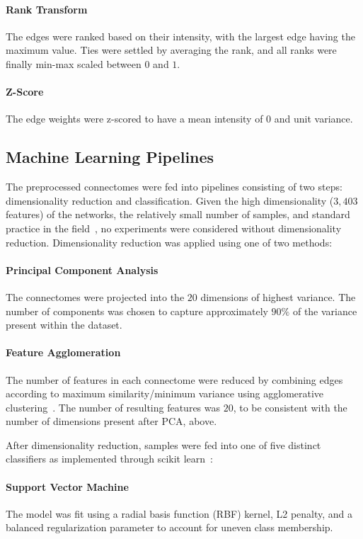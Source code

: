 \documentclass[num-refs]{nbdt-article}
\begin{document}
\paragraph{Rank Transform} The edges were ranked based on their intensity, with the largest edge having the maximum value. Ties were settled by averaging the rank, and all ranks were finally min-max scaled between $0$ and $1$.

\paragraph{Z-Score} The edge weights were z-scored to have a mean intensity of $0$ and unit variance.

\subsection{Machine Learning Pipelines}

The preprocessed connectomes were fed into pipelines consisting of two steps: dimensionality reduction and classification. Given the high dimensionality ($3,403$ features) of the networks, the relatively small number of samples, and standard practice in the field~\cite{Payabvash2019-tm,Park2015-uj,weis2020sex}, no experiments were considered without dimensionality reduction. Dimensionality reduction was applied using one of two methods:

\paragraph{Principal Component Analysis} The connectomes were projected into the $20$ dimensions of highest variance. The number of components was chosen to capture approximately $90\%$ of the variance present within the dataset.

\paragraph{Feature Agglomeration} The number of features in each connectome were reduced by combining edges according to maximum similarity/minimum variance using agglomerative clustering~\cite{Ward1963-uh}. The number of resulting features was $20$, to be consistent with the number of dimensions present after PCA, above.

After dimensionality reduction, samples were fed into one of five distinct classifiers as implemented through scikit learn~\cite{Pedregosa2011-uz}:

\paragraph{Support Vector Machine} The model was fit using a radial basis function (RBF) kernel, L2 penalty, and a balanced regularization parameter to account for uneven class membership.
\end{document}
